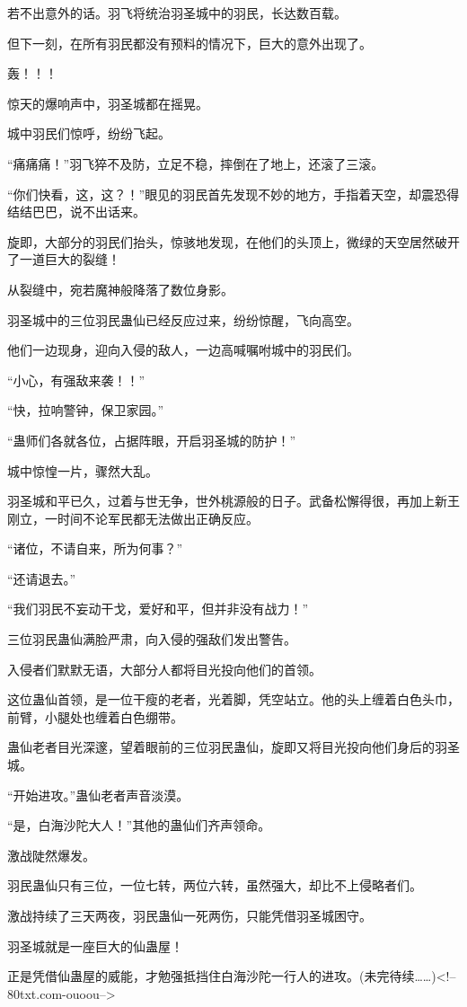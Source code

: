 \begin{this_body}
若不出意外的话。羽飞将统治羽圣城中的羽民，长达数百载。

但下一刻，在所有羽民都没有预料的情况下，巨大的意外出现了。

轰！！！

惊天的爆响声中，羽圣城都在摇晃。

城中羽民们惊呼，纷纷飞起。

“痛痛痛！”羽飞猝不及防，立足不稳，摔倒在了地上，还滚了三滚。

“你们快看，这，这？！”眼见的羽民首先发现不妙的地方，手指着天空，却震恐得结结巴巴，说不出话来。

旋即，大部分的羽民们抬头，惊骇地发现，在他们的头顶上，微绿的天空居然破开了一道巨大的裂缝！

从裂缝中，宛若魔神般降落了数位身影。

羽圣城中的三位羽民蛊仙已经反应过来，纷纷惊醒，飞向高空。

他们一边现身，迎向入侵的敌人，一边高喊嘱咐城中的羽民们。

“小心，有强敌来袭！！”

“快，拉响警钟，保卫家园。”

“蛊师们各就各位，占据阵眼，开启羽圣城的防护！”

城中惊惶一片，骤然大乱。

羽圣城和平已久，过着与世无争，世外桃源般的日子。武备松懈得很，再加上新王刚立，一时间不论军民都无法做出正确反应。

“诸位，不请自来，所为何事？”

“还请退去。”

“我们羽民不妄动干戈，爱好和平，但并非没有战力！”

三位羽民蛊仙满脸严肃，向入侵的强敌们发出警告。

入侵者们默默无语，大部分人都将目光投向他们的首领。

这位蛊仙首领，是一位干瘦的老者，光着脚，凭空站立。他的头上缠着白色头巾，前臂，小腿处也缠着白色绷带。

蛊仙老者目光深邃，望着眼前的三位羽民蛊仙，旋即又将目光投向他们身后的羽圣城。

“开始进攻。”蛊仙老者声音淡漠。

“是，白海沙陀大人！”其他的蛊仙们齐声领命。

激战陡然爆发。

羽民蛊仙只有三位，一位七转，两位六转，虽然强大，却比不上侵略者们。

激战持续了三天两夜，羽民蛊仙一死两伤，只能凭借羽圣城困守。

羽圣城就是一座巨大的仙蛊屋！

正是凭借仙蛊屋的威能，才勉强抵挡住白海沙陀一行人的进攻。(未完待续……)<!--80txt.com-ouoou-->

\end{this_body}


